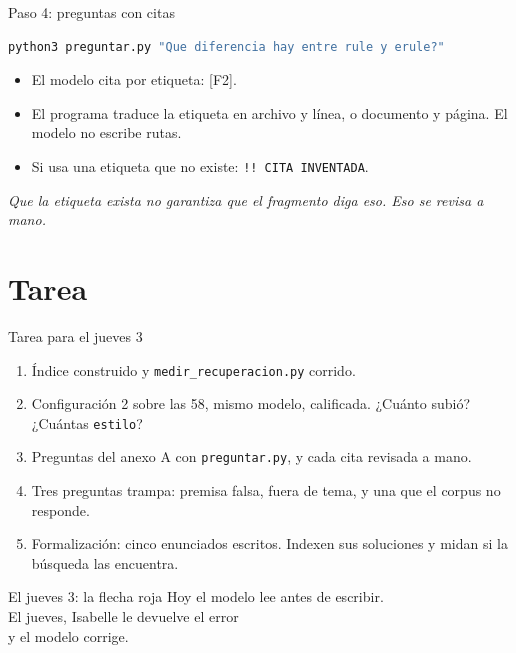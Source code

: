 \documentclass[10pt]{beamer}
\newcommand{\nota}[1]{{\small\itshape\color{psCom} #1}}
\newcommand{\cd}[1]{\texttt{#1}}
\begin{document}
\begin{frame}[fragile]{Paso 4: preguntas con citas}
\begin{lstlisting}[language=bash]
python3 preguntar.py "Que diferencia hay entre rule y erule?"
\end{lstlisting}
  \begin{itemize}
    \item El modelo cita \alert{por etiqueta}: [F2].
    \item El programa traduce la etiqueta en archivo y línea, o documento y
      página. El modelo no escribe rutas.
    \item Si usa una etiqueta que no existe: \cd{!! CITA INVENTADA}.
  \end{itemize}
  \vspace{0.4em}
  \nota{Que la etiqueta exista no garantiza que el fragmento diga eso. Eso
  se revisa a mano.}
\end{frame}

\section{Tarea}

\begin{frame}{Tarea para el jueves 3}
  \begin{enumerate}
    \item Índice construido y \cd{medir\_recuperacion.py} corrido.
    \item Configuración 2 sobre las 58, mismo modelo, calificada. ¿Cuánto
      subió? ¿Cuántas \cd{estilo}?
    \item Preguntas del anexo A con \cd{preguntar.py}, y cada cita revisada
      a mano.
    \item Tres preguntas trampa: premisa falsa, fuera de tema, y una que el
      corpus no responde.
    \item Formalización: cinco enunciados escritos. Indexen sus soluciones
      y midan si la búsqueda las encuentra.
  \end{enumerate}
\end{frame}

\begin{frame}{El jueves 3: la flecha roja}
  \vspace{1em}
  \centering
  \Large
  Hoy el modelo lee antes de escribir.\\[0.5em]
  El jueves, Isabelle le devuelve el error\\
  y el modelo \alert{corrige}.
\end{frame}
\end{document}
